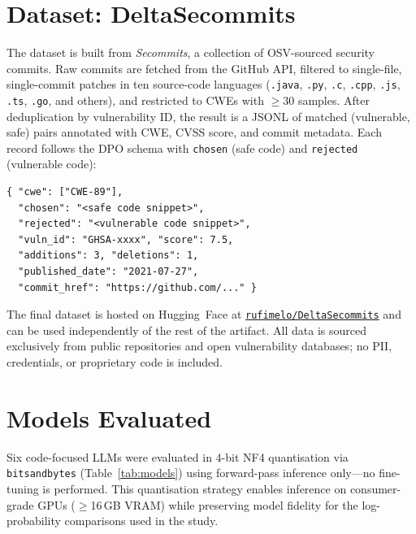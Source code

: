 \documentclass[conference]{IEEEtran}
\begin{document}
\vspace{0.5cm}
\section{Dataset: DeltaSecommits}

The dataset is built from \emph{Secommits}, a collection of OSV-sourced
security commits. Raw commits are fetched from the GitHub API, filtered to
single-file, single-commit patches in ten source-code languages
(\texttt{.java}, \texttt{.py}, \texttt{.c}, \texttt{.cpp}, \texttt{.js},
\texttt{.ts}, \texttt{.go}, and others), and restricted to CWEs with
$\geq 30$ samples. After deduplication by vulnerability ID, the result is a
JSONL of matched (vulnerable, safe) pairs annotated with CWE, CVSS score, and
commit metadata. Each record follows the DPO schema with
\texttt{chosen} (safe code) and \texttt{rejected} (vulnerable code):

\smallskip
{\footnotesize
\begin{verbatim}
{ "cwe": ["CWE-89"],
  "chosen": "<safe code snippet>",
  "rejected": "<vulnerable code snippet>",
  "vuln_id": "GHSA-xxxx", "score": 7.5,
  "additions": 3, "deletions": 1,
  "published_date": "2021-07-27",
  "commit_href": "https://github.com/..." }
\end{verbatim}
}

\noindent The final dataset is hosted on Hugging~Face at
\href{https://huggingface.co/datasets/rufimelo/DeltaSecommits}%
{\texttt{rufimelo/DeltaSecommits}} and can be used independently of the rest
of the artifact.
All data is sourced exclusively from public repositories and open vulnerability
databases; no PII, credentials, or proprietary code is included.

\vspace{0.5cm}
\section{Models Evaluated}

Six code-focused LLMs were evaluated in 4-bit NF4 quantisation via
\texttt{bitsandbytes} (Table~\ref{tab:models}) using forward-pass inference
only---no fine-tuning is performed. This quantisation strategy enables
inference on consumer-grade GPUs ($\geq$16\,GB VRAM) while preserving model
fidelity for the log-probability comparisons used in the study.
\end{document}
